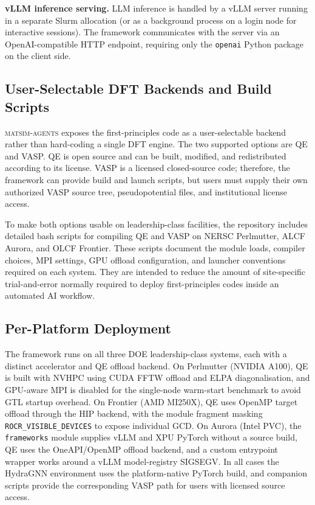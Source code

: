 \documentclass[conference]{IEEEtran}
\def\ac#1{#1}%
\def\acs#1{#1}%
\def\acp#1{#1}%
\begin{document}
\textbf{vLLM inference serving.} \acs{LLM} inference is handled by a vLLM server
running in a separate Slurm allocation (or as a background process on a login
node for interactive sessions). The framework communicates with the server via
an OpenAI-compatible \ac{HTTP} endpoint, requiring only the \texttt{openai} Python
package on the client side.

\subsection{User-Selectable DFT Backends and Build Scripts}
\textsc{matsim-agents} exposes the first-principles code as a user-selectable
backend rather than hard-coding a single \acs{DFT} engine. The two supported options
are \acs{QE} and \acs{VASP}. \acs{QE} is open source and can be built,
modified, and redistributed according to its license. \acs{VASP} is a licensed
closed-source code; therefore, the framework can provide build and launch
scripts, but users must supply their own authorized \acs{VASP} source tree,
pseudopotential files, and institutional license access.

To make both options usable on leadership-class facilities, the repository
includes detailed bash scripts for compiling \acs{QE} and \acs{VASP} on \acs{NERSC} Perlmutter,
\acs{ALCF} Aurora, and \acs{OLCF} Frontier. These scripts document the module loads,
compiler choices, \acs{MPI} settings, \acs{GPU} offload configuration, and launcher
conventions required on each system. They are intended to reduce the amount of
site-specific trial-and-error normally required to deploy first-principles codes
inside an automated \acs{AI} workflow.

\subsection{Per-Platform Deployment}
The framework runs on all three \acs{DOE} leadership-class systems, each with a
distinct accelerator and \acs{QE} offload backend. On Perlmutter (NVIDIA A100),
\acs{QE} is built with NVHPC using \acs{CUDA} \ac{FFTW} offload and \ac{ELPA}
diagonalisation, and \acs{GPU}-aware \acs{MPI} is disabled for the single-node
warm-start benchmark to avoid \ac{GTL} startup overhead. On Frontier (AMD
MI250X), \acs{QE} uses OpenMP target offload through the HIP backend, with the
module fragment masking \texttt{ROCR\_VISIBLE\_DEVICES} to expose individual
\acp{GCD}. On Aurora (Intel \acs{PVC}), the \texttt{frameworks} module supplies
vLLM and \ac{XPU} PyTorch without a source build, \acs{QE} uses the OneAPI/OpenMP
offload backend, and a custom entrypoint wrapper works around a vLLM
model-registry SIGSEGV. In all cases the HydraGNN environment uses the
platform-native PyTorch build, and companion scripts provide the corresponding
\acs{VASP} path for users with licensed source access.
\end{document}
